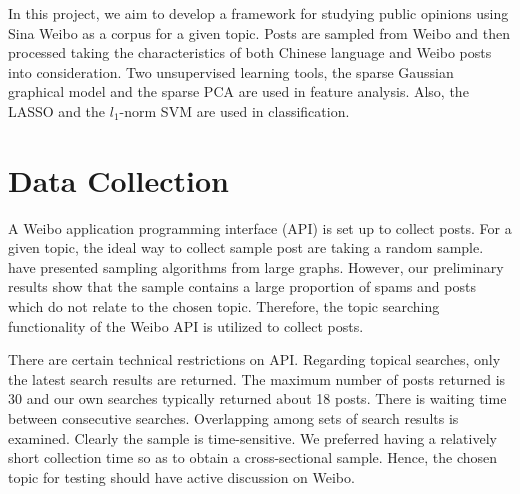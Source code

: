\documentclass[11pt]{article}
\newcommand{\1}[1]{{\mathbf 1}\left\{#1\right\}}        %
\begin{document}
In this project, we aim to develop a framework for studying public opinions using Sina Weibo as a corpus for a given topic. Posts are sampled from Weibo and then processed taking the characteristics of both Chinese language and Weibo posts into consideration. Two unsupervised learning tools, the sparse Gaussian graphical model and the sparse PCA are used in feature analysis. Also, the LASSO and the $l_1$-norm SVM are used in classification. 


\section{Data Collection}\label{subsec:datacol}

A Weibo  application programming interface (API) is set up to collect posts.
For a given topic, the ideal way to collect sample post are taking a random sample. \cite{boyd2004fastest, leskovec2006sampling, wang2011understanding} have presented sampling algorithms from large graphs. However, our preliminary results show that the sample contains a large proportion of spams and posts which do not relate to the chosen topic. Therefore, the topic searching functionality of the Weibo API is utilized to collect posts. 

There are certain technical restrictions on API. Regarding topical searches, only the latest search results are returned. The maximum number of posts returned is 30 and our own searches typically returned about 18 posts. There is waiting time between consecutive searches. Overlapping among sets of search results is examined. Clearly the sample is time-sensitive. We preferred having a relatively short collection time so as to obtain a cross-sectional sample. Hence, the chosen topic for testing should have active discussion on Weibo. 
\end{document}

